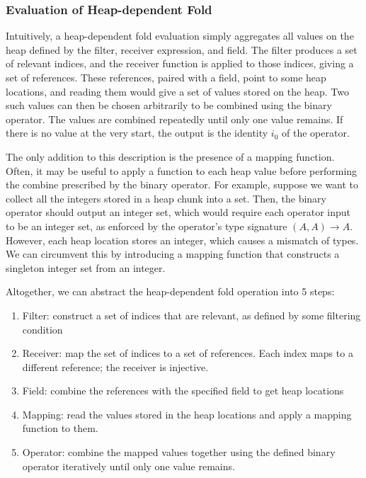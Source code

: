 \documentclass[msc,oneside]{ubcthesis}
\theoremstyle{definition}
\begin{document}
\subsubsection{Evaluation of Heap-dependent Fold}
Intuitively, a heap-dependent fold evaluation simply aggregates all values on the heap defined by the filter, receiver expression, and field. The filter produces a set of relevant indices, and the receiver function is applied to those indices, giving a set of references. These references, paired with a field, point to some heap locations, and reading them would give a set of values stored on the heap. Two such values can then be chosen arbitrarily to be combined using the binary operator. The values are combined repeatedly until only one value remains. If there is no value at the very start, the output is the identity $i_0$ of the operator. 

The only addition to this description is the presence of a mapping function. Often, it may be useful to apply a function to each heap value before performing the combine prescribed by the binary operator. For example, suppose we want to collect all the integers stored in a heap chunk into a set. Then, the binary operator should output an integer set, which would require each operator input to be an integer set, as enforced by the operator's type signature $(A, A) \rightarrow A$. However, each heap location stores an integer, which causes a mismatch of types. We can circumvent this by introducing a mapping function that constructs a singleton integer set from an integer.

Altogether, we can abstract the heap-dependent fold operation into 5 steps:
\begin{enumerate}
    \item Filter: construct a set of indices that are relevant, as defined by some filtering condition
    \item Receiver: map the set of indices to a set of references. Each index maps to a different reference; the receiver is injective.
    \item Field: combine the references with the specified field to get heap locations
    \item Mapping: read the values stored in the heap locations and apply a mapping function to them.
    \item Operator: combine the mapped values together using the defined binary operator iteratively until only one value remains.
\end{enumerate}
\end{document}
